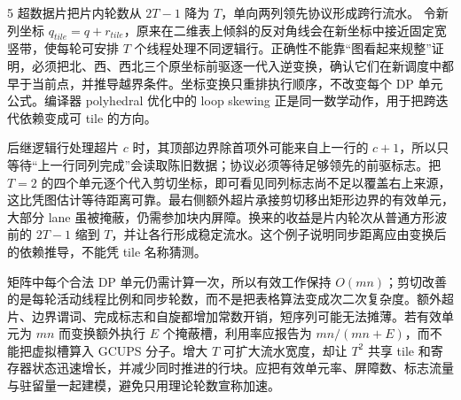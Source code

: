 \begin{solutionexercise}{5}
\conclusionheading 超数据片把片内轮数从 $2T-1$ 降为 $T$，单向两列领先协议形成跨行流水。
\discussionheading
{}令新列坐标 $q_{tile}=q+r_{tile}$，原来在二维表上倾斜的反对角线会在新坐标中接近固定宽竖带，使每轮可安排 $T$ 个线程处理不同逻辑行。正确性不能靠“图看起来规整”证明，必须把北、西、西北三个原坐标前驱逐一代入逆变换，确认它们在新调度中都早于当前点，并推导越界条件。坐标变换只重排执行顺序，不改变每个 DP 单元公式。编译器 polyhedral 优化中的 loop skewing 正是同一数学动作，用于把跨迭代依赖变成可 tile 的方向。

后继逻辑行处理超片 $c$ 时，其顶部边界除首项外可能来自上一行的 $c+1$，所以只等待“上一行同列完成”会读取陈旧数据；协议必须等待足够领先的前驱标志。把 $T=2$ 的四个单元逐个代入剪切坐标，即可看见同列标志尚不足以覆盖右上来源，这比凭图估计等待距离可靠。最右侧额外超片承接剪切移出矩形边界的有效单元，大部分 lane 虽被掩蔽，仍需参加块内屏障。换来的收益是片内轮次从普通方形波前的 $2T-1$ 缩到 $T$，并让各行形成稳定流水。这个例子说明同步距离应由变换后的依赖推导，不能凭 tile 名称猜测。

矩阵中每个合法 DP 单元仍需计算一次，所以有效工作保持 $O(mn)$；剪切改善的是每轮活动线程比例和同步轮数，而不是把表格算法变成次二次复杂度。额外超片、边界谓词、完成标志和自旋都增加常数开销，短序列可能无法摊薄。若有效单元为 $mn$ 而变换额外执行 $E$ 个掩蔽槽，利用率应报告为 $mn/(mn+E)$，而不能把虚拟槽算入 GCUPS 分子。增大 $T$ 可扩大流水宽度，却让 $T^2$ 共享 tile 和寄存器状态迅速增长，并减少同时推进的行块。应把有效单元率、屏障数、标志流量与驻留量一起建模，避免只用理论轮数宣称加速。


\end{solutionexercise}

